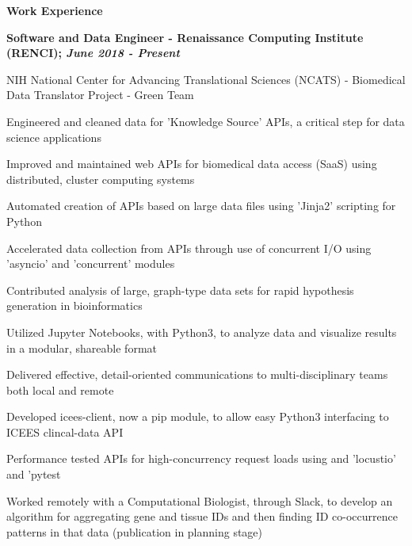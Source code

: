 \documentclass[letterpaper,final]{memoir}
\newcommand{\Sep}{\vspace{1.0em}}
\newcommand{\SmallSep}{\vspace{0.4em}}
\newcommand{\CVSection}[1]
	{\LARGE\textbf{#1}\par
	\SmallSep\normalsize}
\newcommand{\CVItem}[1]
	{\textbf{\color{Blue} #1}}
\begin{document}

\notoserif \CVSection{Work Experience}
\normalfont

\Sep

\CVItem{Software and Data Engineer - Renaissance Computing Institute (RENCI); \textit{June 2018 - Present}}
\begin{compactitem}[\color{Blue}$\circ$]
    
    \SmallSep
    \item NIH National Center for Advancing Translational Sciences (NCATS) - Biomedical Data Translator Project - Green Team
    \SmallSep
    \item Engineered and cleaned data for 'Knowledge Source' APIs, a critical step for data science applications
    \SmallSep  
    \item Improved and maintained web APIs for biomedical data access (SaaS) using distributed, cluster computing systems
    \SmallSep
    \item Automated creation of APIs based on large data files using 'Jinja2' scripting for Python
    \SmallSep
    \item Accelerated data collection from APIs through use of concurrent I/O using 'asyncio' and 'concurrent' modules
    \SmallSep
    \item Contributed analysis of large, graph-type data sets for rapid hypothesis generation in bioinformatics
    \SmallSep
    \item Utilized Jupyter Notebooks, with Python3, to analyze data and visualize results in a modular, shareable format
    \SmallSep
    \item Delivered effective, detail-oriented communications to multi-disciplinary teams both local and remote
    \SmallSep
    \item Developed icees-client, now a pip module, to allow easy Python3 interfacing to ICEES clincal-data API
    \SmallSep
    \item Performance tested APIs for high-concurrency request loads using and 'locustio' and 'pytest
    \SmallSep
    \item Worked remotely with a Computational Biologist, through Slack, to develop an algorithm for 
    aggregating gene and tissue IDs and then finding ID co-occurrence patterns in that data (publication in planning stage)

\end{compactitem}

\Sep
\end{document}
